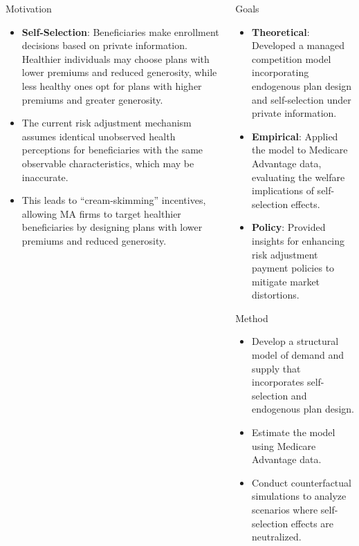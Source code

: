 \documentclass{beamer}
\begin{document}
\begin{frame}[t]
\begin{columns}[t]
\begin{column}{.3\textwidth}
      \begin{block}{Motivation}
        \begin{itemize}
            \item \textbf{Self-Selection}: Beneficiaries make enrollment decisions based on private information. Healthier individuals may choose plans with lower premiums and reduced generosity, while less healthy ones opt for plans with higher premiums and greater generosity.
            \item The current risk adjustment mechanism assumes identical unobserved health perceptions for beneficiaries with the same observable characteristics, which may be inaccurate.
            \item This leads to ``cream-skimming'' incentives, allowing MA firms to target healthier beneficiaries by designing plans with lower premiums and reduced generosity.
        \end{itemize}
      \end{block}
    \end{column}
    \begin{column}{.3\textwidth}
      \begin{block}{Goals}
        \begin{itemize}
          \item \textbf{Theoretical}: Developed a managed competition model incorporating endogenous plan design and self-selection under private information.
          \item \textbf{Empirical}: Applied the model to Medicare Advantage data, evaluating the welfare implications of self-selection effects.
          \item \textbf{Policy}: Provided insights for enhancing risk adjustment payment policies to mitigate market distortions.
        \end{itemize}
      \end{block}

      \begin{block}{Method}
        \begin{itemize}
          \item Develop a structural model of demand and supply that incorporates self-selection and endogenous plan design.
          \item Estimate the model using Medicare Advantage data.
          \item Conduct counterfactual simulations to analyze scenarios where self-selection effects are neutralized.
        \end{itemize}
      \end{block}


\end{column}
\end{columns}
\end{frame}
\end{document}
